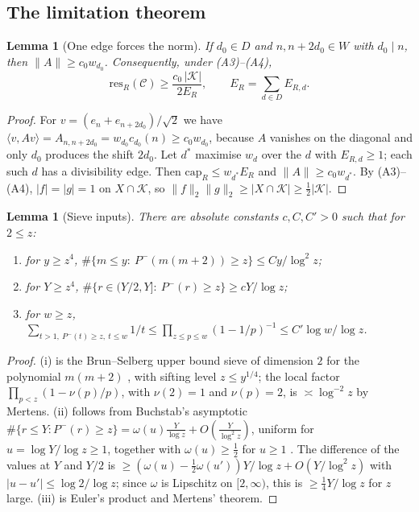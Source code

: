 \documentclass[11pt]{amsart}
\newtheorem{lemma}[theorem]{Lemma}
\theoremstyle{definition}
\theoremstyle{remark}
\newcommand{\res}{\mathrm{res}}
\newcommand{\capR}{\mathrm{cap}}
\begin{document}
\subsection{The limitation theorem}

\begin{lemma}[One edge forces the norm]\label{lem:edge}
If $d_0\in D$ and $n,n+2d_0\in W$ with $d_0\mid n$, then $\|A\|\ge c_0w_{d_0}$. Consequently, under (A3)--(A4),
\[
\res_R(\mathcal C)\ge\frac{c_0\,|\mathcal K|}{2E_R},\qquad E_R=\sum_{d\in D}E_{R,d}.
\]
\end{lemma}
\begin{proof}
For $v=(e_n+e_{n+2d_0})/\sqrt2$ we have $\langle v,Av\rangle=A_{n,n+2d_0}=w_{d_0}c_{d_0}(n)\ge c_0w_{d_0}$, because $A$ vanishes on the diagonal and only $d_0$ produces the shift $2d_0$. Let $d^*$ maximise $w_d$ over the $d$ with $E_{R,d}\ge1$; each such $d$ has a divisibility edge. Then $\capR_R\le w_{d^*}E_R$ and $\|A\|\ge c_0w_{d^*}$. By (A3)--(A4), $|f|=|g|=1$ on $X\cap\mathcal K$, so $\|f\|_2\|g\|_2\ge|X\cap\mathcal K|\ge\frac12|\mathcal K|$.
\end{proof}

\begin{lemma}[Sieve inputs]\label{lem:sieve-inputs}
There are absolute constants $c,C,C'>0$ such that for $2\le z$:
\begin{enumerate}
\item[(i)] for $y\ge z^4$, $\#\{m\le y:\ P^-(m(m+2))\ge z\}\le Cy/\log^2z$;
\item[(ii)] for $Y\ge z^4$, $\#\{r\in(Y/2,Y]:\ P^-(r)\ge z\}\ge cY/\log z$;
\item[(iii)] for $w\ge z$, $\sum_{t>1,\ P^-(t)\ge z,\ t\le w}1/t\le\prod_{z\le p\le w}(1-1/p)^{-1}\le C'\log w/\log z$.
\end{enumerate}
\end{lemma}
\begin{proof}
(i) is the Brun--Selberg upper bound sieve of dimension $2$ for the polynomial $m(m+2)$ \cite[Thm.~2.2]{HR74}, with sifting level $z\le y^{1/4}$; the local factor $\prod_{p<z}(1-\nu(p)/p)$, with $\nu(2)=1$ and $\nu(p)=2$, is $\asymp\log^{-2}z$ by Mertens. (ii) follows from Buchstab's asymptotic $\#\{r\le Y:P^-(r)\ge z\}=\omega(u)\frac{Y}{\log z}+O(\frac{Y}{\log^2z})$, uniform for $u=\log Y/\log z\ge1$, together with $\omega(u)\ge\frac12$ for $u\ge1$ \cite[III.6]{Ten15}. The difference of the values at $Y$ and $Y/2$ is $\ge(\omega(u)-\frac12\omega(u'))Y/\log z+O(Y/\log^2z)$ with $|u-u'|\le\log2/\log z$; since $\omega$ is Lipschitz on $[2,\infty)$, this is $\ge\frac14Y/\log z$ for $z$ large. (iii) is Euler's product and Mertens' theorem.
\end{proof}
\end{document}
